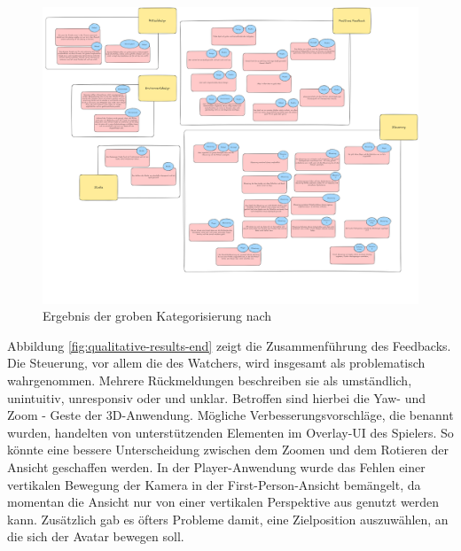 
\begin{figure}[ht]
\centering
\includegraphics[width=1\linewidth]{content/pictures/Qualitative-Auswertung-Schritt-1.png}
\caption{Ergebnis der groben Kategorisierung nach \cite{braun_using_2006}}
\label{fig:qualitative-results}
\end{figure}

Abbildung \ref{fig:qualitative-results-end} zeigt die Zusammenführung des Feedbacks. 
Die Steuerung, vor allem die des Watchers, wird insgesamt als problematisch wahrgenommen. Mehrere Rückmeldungen beschreiben sie als umständlich, unintuitiv, unresponsiv oder  und unklar. Betroffen sind hierbei die Yaw- und Zoom - Geste der \ac{3D}-Anwendung. Mögliche Verbesserungsvorschläge, die benannt wurden, handelten von unterstützenden Elementen im Overlay-\ac{UI} des Spielers. So könnte eine bessere Unterscheidung zwischen dem Zoomen und dem Rotieren der Ansicht geschaffen werden. 
In der Player-Anwendung wurde das Fehlen einer vertikalen Bewegung der Kamera in der First-Person-Ansicht bemängelt, da momentan die Ansicht nur von einer vertikalen Perspektive aus genutzt werden kann. Zusätzlich gab es öfters Probleme damit, eine Zielposition auszuwählen, an die sich der Avatar bewegen soll.

